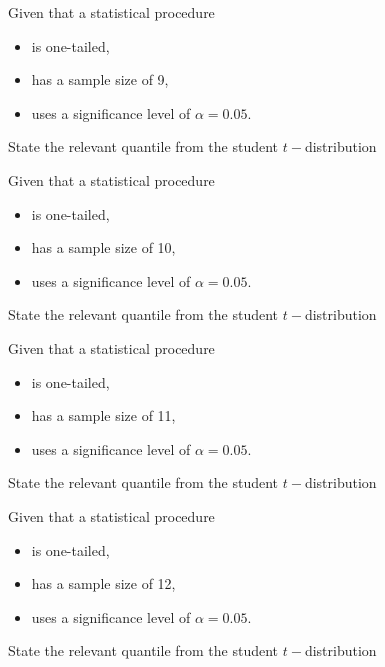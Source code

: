 \documentclass[12pt, a4paper]{report}
\theoremstyle{definition}
\theoremstyle{remark}
\begin{document}

	
	
	
	Given that a statistical procedure
	\begin{itemize}
		\item is one-tailed,
		\item has a sample size of 9,
		\item uses a significance level of $\alpha = 0.05$.
	\end{itemize} \smallskip
	State the relevant quantile from the student $t-$distribution
	


	
	
	
	Given that a statistical procedure 
	\begin{itemize}
		\item is one-tailed,
		\item has a sample size of 10,
		\item uses a significance level of $\alpha = 0.05$.
	\end{itemize} \smallskip
	State the relevant quantile from the student $t-$distribution
	


	
	
	
	Given that a statistical procedure 
	\begin{itemize}
		\item is one-tailed,
		\item has a sample size of 11,
		\item uses a significance level of $\alpha = 0.05$.
	\end{itemize} \smallskip
	State the relevant quantile from the student $t-$distribution
	



	
	
	
	Given that a statistical procedure 
	\begin{itemize}
		\item is one-tailed,
		\item has a sample size of 12,
		\item uses a significance level of $\alpha = 0.05$.
	\end{itemize} \smallskip
	State the relevant quantile from the student $t-$distribution
	
\end{document}
